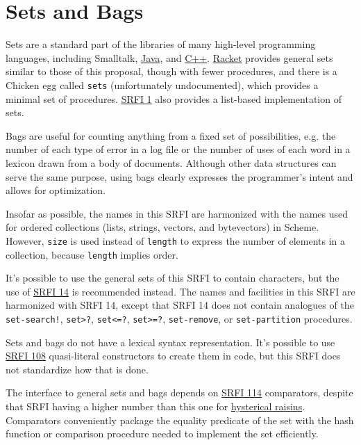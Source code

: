 \section{Sets and Bags}

Sets are a standard part of the libraries of many high-level programming
languages, including Smalltalk,
\href{http://docs.oracle.com/javase/6/docs/api/java/util/Set.html}{Java},
and \href{http://www.cplusplus.com/reference/set/set/}{C++}.
\href{http://docs.racket-lang.org/reference/sets.html}{Racket} provides
general sets similar to those of this proposal, though with fewer
procedures, and there is a Chicken egg called \texttt{sets}
(unfortunately undocumented), which provides a minimal set of
procedures. \href{http://srfi.schemers.org/srfi-1/srfi-1.html}{SRFI 1}
also provides a list-based implementation of sets.

Bags are useful for counting anything from a fixed set of possibilities,
e.g. the number of each type of error in a log file or the number of
uses of each word in a lexicon drawn from a body of documents. Although
other data structures can serve the same purpose, using bags clearly
expresses the programmer's intent and allows for optimization.

Insofar as possible, the names in this SRFI are harmonized with the
names used for ordered collections (lists, strings, vectors, and
bytevectors) in Scheme. However, \texttt{size} is used instead of
\texttt{length} to express the number of elements in a collection,
because \texttt{length} implies order.

It's possible to use the general sets of this SRFI to contain
characters, but the use of
\href{http://srfi.schemers.org/srfi-14/srfi-14.html}{SRFI 14} is
recommended instead. The names and facilities in this SRFI are
harmonized with SRFI 14, except that SRFI 14 does not contain analogues
of the \texttt{set-search!}, \texttt{set\textgreater{}?},
\texttt{set\textless{}=?}, \texttt{set\textgreater{}=?},
\texttt{set-remove}, or \texttt{set-partition} procedures.

Sets and bags do not have a lexical syntax representation. It's possible
to use \href{http://srfi.schemers.org/srfi-108/srfi-108.html}{SRFI 108}
quasi-literal constructors to create them in code, but this SRFI does
not standardize how that is done.

The interface to general sets and bags depends on
\href{http://srfi.schemers.org/srfi-114/srfi-114.html}{SRFI 114}
comparators, despite that SRFI having a higher number than this one for
\href{http://www.catb.org/jargon/html/H/hysterical-reasons.html}{hysterical
raisins}. Comparators conveniently package the equality predicate of the
set with the hash function or comparison procedure needed to implement
the set efficiently.
